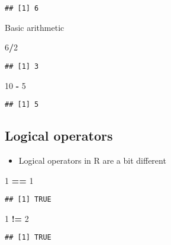 \documentclass[]{article}
\newenvironment{Shaded}{\begin{snugshade}}{\end{snugshade}}
\newcommand{\DecValTok}[1]{\textcolor[rgb]{0.00,0.00,0.81}{#1}}
\newcommand{\StringTok}[1]{\textcolor[rgb]{0.31,0.60,0.02}{#1}}
\newcommand{\OperatorTok}[1]{\textcolor[rgb]{0.81,0.36,0.00}{\textbf{#1}}}
\providecommand{\tightlist}{%
  \setlength{\itemsep}{0pt}\setlength{\parskip}{0pt}}
\begin{document}
\begin{verbatim}
## [1] 6
\end{verbatim}

Basic arithmetic

\begin{Shaded}
\begin{Highlighting}[]
\DecValTok{6}\OperatorTok{/}\DecValTok{2}
\end{Highlighting}
\end{Shaded}

\begin{verbatim}
## [1] 3
\end{verbatim}

\begin{Shaded}
\begin{Highlighting}[]
\DecValTok{10} \OperatorTok{-}\StringTok{ }\DecValTok{5}
\end{Highlighting}
\end{Shaded}

\begin{verbatim}
## [1] 5
\end{verbatim}

\subsection{Logical operators}\label{logical-operators}

\begin{itemize}
\tightlist
\item
  Logical operators in R are a bit different
\end{itemize}

\begin{Shaded}
\begin{Highlighting}[]
\DecValTok{1} \OperatorTok{==}\StringTok{ }\DecValTok{1}
\end{Highlighting}
\end{Shaded}

\begin{verbatim}
## [1] TRUE
\end{verbatim}

\begin{Shaded}
\begin{Highlighting}[]
\DecValTok{1} \OperatorTok{!=}\StringTok{ }\DecValTok{2}
\end{Highlighting}
\end{Shaded}

\begin{verbatim}
## [1] TRUE
\end{verbatim}
\end{document}
